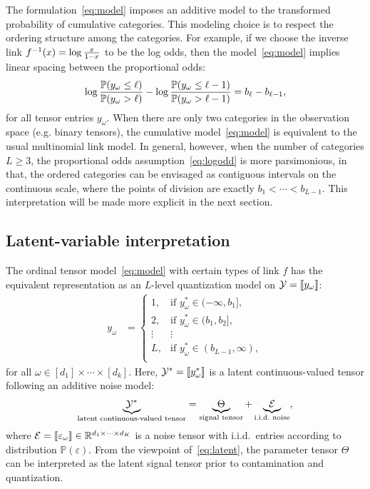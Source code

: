 \documentclass[11pt]{article}
\theoremstyle{plain}
\theoremstyle{definition}
\newcommand*{\KeepStyleUnderBrace}[1]{%
  \mathop{%
    \mathchoice
    {\underbrace{\displaystyle#1}}%
    {\underbrace{\textstyle#1}}%
    {\underbrace{\scriptstyle#1}}%
    {\underbrace{\scriptscriptstyle#1}}%
  }\limits
}
\begin{document}
The formulation~\eqref{eq:model} imposes an additive model to the transformed probability of cumulative categories. This modeling choice is to respect the ordering structure among the categories. For example, if we choose the inverse link $f^{-1}(x)=\log {x\over 1-x}$ to be the log odds, then the model~\eqref{eq:model} implies linear spacing between the proportional odds:
\begin{equation}\label{eq:logodd}
\log {\mathbb{P}(y_{\omega}\leq \ell) \over \mathbb{P}(y_\omega >  \ell) } - \log {\mathbb{P}(y_{\omega}\leq {\ell-1}) \over \mathbb{P}(y_\omega >  {\ell-1}) } = b_\ell-b_{\ell-1},
\end{equation}
for all tensor entries $y_\omega$. When there are only two categories in the observation space (e.g. binary tensors), the cumulative model~\eqref{eq:model} is equivalent to the usual multinomial link model. In general, however, when the number of categories $L\geq 3$, the proportional odds assumption~\eqref{eq:logodd} is more parsimonious, in that, the ordered categories can be envisaged as contiguous intervals on the continuous scale, where the points of division are exactly $b_1<\cdots <b_{L-1}$. This interpretation will be made more explicit in the next section.

\subsection{Latent-variable interpretation}\label{sec:latent}
The ordinal tensor model~\eqref{eq:model} with certain types of link $f$ has the equivalent representation as an $L$-level quantization model on $\mathcal{Y}=\llbracket y_\omega \rrbracket$:
\begin{align}\label{eq:quantization}
y_\omega&=
\begin{cases}
1,& \text{if $y^*_\omega\in(-\infty, b_1]$},\\
2,& \text{if $y^*_\omega\in(b_1, b_2]$},\\
\vdots  &\vdots\\
L,& \text{if $y^*_\omega\in(b_{L-1}, \infty)$},\\
\end{cases}
\end{align}
for all $\omega\in[d_1]\times \cdots \times [d_k]$. Here, $\mathcal{Y}^*=\llbracket y^*_\omega \rrbracket$ is a latent continuous-valued tensor following an additive noise model:
\begin{align}\label{eq:latent}
\KeepStyleUnderBrace{\tY^*}_{\text{latent continuous-valued tensor}}=\KeepStyleUnderBrace{\Theta}_{\text{signal tensor}}+\KeepStyleUnderBrace{\tE}_{\text{i.i.d.\ noise}},
\end{align}
where $\mathcal{E}=\llbracket \varepsilon_\omega \rrbracket\in\mathbb{R}^{d_1\times \cdots \times d_K}$ is a noise tensor with i.i.d.\ entries according to distribution $\mathbb{P}(\varepsilon)$. From the viewpoint of~\eqref{eq:latent}, the parameter tensor $\Theta$ can be interpreted as the latent signal tensor prior to contamination and quantization.
\end{document}
